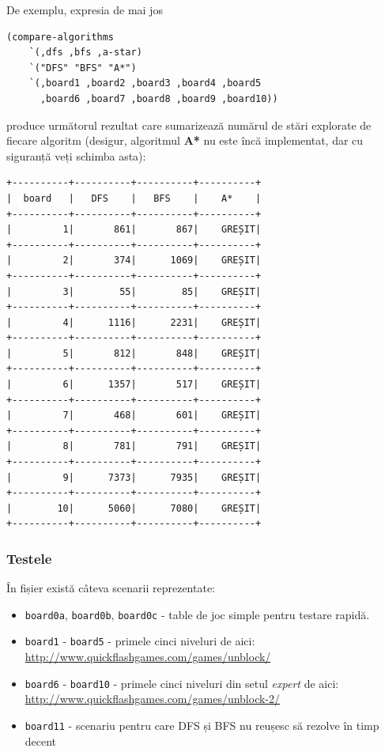 \documentclass[12pt]{article}
\begin{document}
De exemplu, expresia de mai jos
\begin{verbatim}
(compare-algorithms
    `(,dfs ,bfs ,a-star)
    `("DFS" "BFS" "A*")
    `(,board1 ,board2 ,board3 ,board4 ,board5 
      ,board6 ,board7 ,board8 ,board9 ,board10))
\end{verbatim}
produce următorul rezultat care sumarizează numărul de stări explorate
de fiecare algoritm (desigur, algoritmul \textbf{A*} nu este încă
implementat, dar cu siguranță veți schimba asta):
\begin{verbatim}
+----------+----------+----------+----------+
|  board   |   DFS    |   BFS    |    A*    |
+----------+----------+----------+----------+
|         1|       861|       867|    GREȘIT|
+----------+----------+----------+----------+
|         2|       374|      1069|    GREȘIT|
+----------+----------+----------+----------+
|         3|        55|        85|    GREȘIT|
+----------+----------+----------+----------+
|         4|      1116|      2231|    GREȘIT|
+----------+----------+----------+----------+
|         5|       812|       848|    GREȘIT|
+----------+----------+----------+----------+
|         6|      1357|       517|    GREȘIT|
+----------+----------+----------+----------+
|         7|       468|       601|    GREȘIT|
+----------+----------+----------+----------+
|         8|       781|       791|    GREȘIT|
+----------+----------+----------+----------+
|         9|      7373|      7935|    GREȘIT|
+----------+----------+----------+----------+
|        10|      5060|      7080|    GREȘIT|
+----------+----------+----------+----------+
\end{verbatim}

\subsubsection*{Testele}

În fișier există câteva scenarii reprezentate:
\begin{itemize}
\item \texttt{board0a}, \texttt{board0b}, \texttt{board0c} - table de
  joc simple pentru testare rapidă.
\item \texttt{board1} - \texttt{board5} - primele cinci niveluri de
  aici: \url{http://www.quickflashgames.com/games/unblock/}
\item \texttt{board6} - \texttt{board10} - primele cinci niveluri din
  setul \emph{expert} de aici:
  \url{http://www.quickflashgames.com/games/unblock-2/}
\item \texttt{board11} - scenariu pentru care DFS și BFS nu reușesc să
  rezolve în timp decent
\end{itemize}
\end{document}
